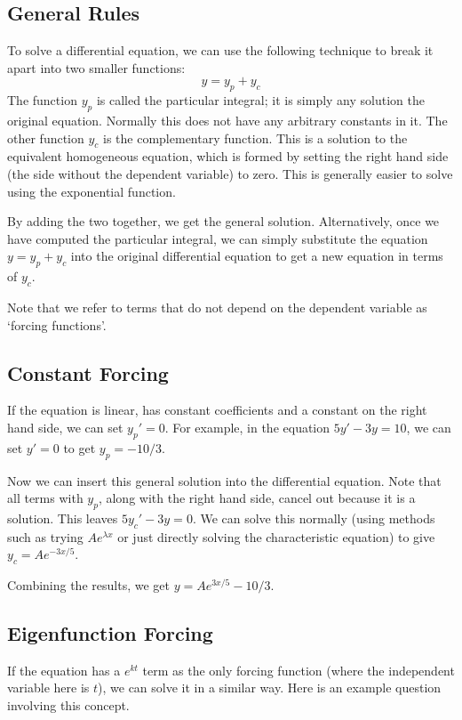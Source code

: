 \subsection{General Rules}
To solve a differential equation, we can use the following technique to break it apart into two smaller functions:
\[ y = y_p + y_c \]
The function \(y_p\) is called the particular integral; it is simply any solution
the original equation. Normally this does not have any arbitrary constants in it. The other function \(y_c\) is the complementary function. This is a solution to the equivalent homogeneous equation, which is formed by setting the right hand side (the side without the dependent variable) to zero. This is generally easier to solve using the exponential function.

By adding the two together, we get the general solution. Alternatively, once we have computed the particular integral, we can simply substitute the equation \(y = y_p + y_c\) into the original differential equation to get a new equation in terms of \(y_c\).

Note that we refer to terms that do not depend on the dependent variable as `forcing functions'.

\subsection{Constant Forcing}
If the equation is linear, has constant coefficients and a constant on the right hand side, we can set \(y_p' = 0\). For example, in the equation \(5y' - 3y = 10\), we can set \(y' = 0\) to get \(y_p = -10/3\).

Now we can insert this general solution into the differential equation. Note that all terms with \(y_p\), along with the right hand side, cancel out because it is a solution. This leaves \(5y_c' - 3y = 0\). We can solve this normally (using methods such as trying \(Ae^{\lambda x}\) or just directly solving the characteristic equation) to give \(y_c = Ae^{-3x/5}\).

Combining the results, we get \(y = Ae^{3x/5} - 10/3\).

\subsection{Eigenfunction Forcing}
If the equation has a \(e^{kt}\) term as the only forcing function (where the independent variable here is \(t\)), we can solve it in a similar way. Here is an example question involving this concept.

